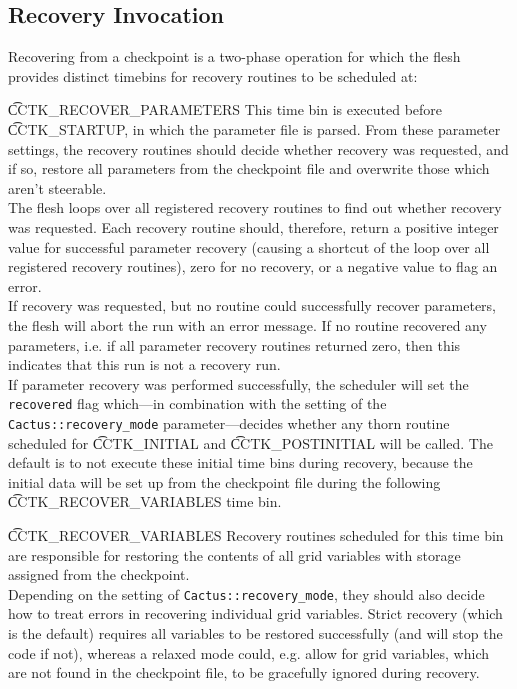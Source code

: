 \subsection{Recovery Invocation}

Recovering from a checkpoint is a two-phase operation for which the flesh
provides distinct timebins for recovery routines to be scheduled at:
%
\begin{Lentry}
  \item[{\t CCTK\_RECOVER\_PARAMETERS}] This time bin is executed before
    {\t CCTK\_STARTUP}, in which the parameter file is parsed. From these parameter
    settings, the recovery routines should decide whether recovery was
    requested, and if so, restore all parameters from the checkpoint file and
    overwrite those which aren't steerable.\\
    The flesh loops over all registered recovery routines to find out
    whether recovery was requested. Each recovery routine should, therefore,
    return a positive integer value for successful parameter recovery (causing
    a shortcut of the loop over all registered recovery routines),
    zero for no recovery, or a negative value to flag an error.\\
    If recovery was requested, but no routine could successfully recover
    parameters, the flesh will abort the run with an error message.
    If no routine recovered any parameters, i.e. if all parameter
    recovery routines returned zero, then this indicates that this run
    is not a recovery run.\\
    If parameter recovery was performed successfully, the scheduler will set the
    {\tt recovered} flag which---in combination with the setting of the {\tt
    Cactus::recovery\_mode} parameter---decides whether any thorn routine
    scheduled for {\t CCTK\_INITIAL} and {\t CCTK\_POSTINITIAL} will be called.
    The default is to not execute these initial time bins during recovery, 
    because the initial data will be set up from the checkpoint file during the
    following {\t CCTK\_RECOVER\_VARIABLES} time bin.
  \item[{\t CCTK\_RECOVER\_VARIABLES}]
    Recovery routines scheduled for this time bin are responsible for restoring
    the contents of all grid variables with storage assigned from the
    checkpoint.\\
    Depending on the setting of {\tt Cactus::recovery\_mode}, they should also
    decide how to treat errors in recovering individual grid variables. Strict
    recovery (which is the default) requires all variables to be restored
    successfully (and will stop the code if not), whereas a relaxed mode
    could, e.g. allow for grid variables, which are not found in the checkpoint
    file, to be gracefully ignored during recovery.
\end{Lentry}


